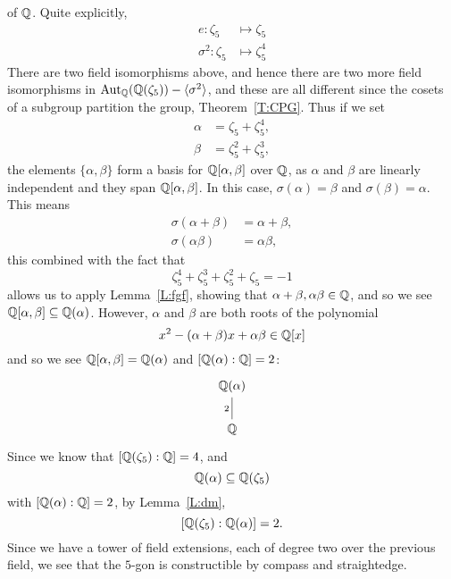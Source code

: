 \documentclass{ximera}
\begin{document}
\begin{example}
  of $\mathbb Q$. Quite explicitly,
  \begin{align*}
    e: \zeta_5 &\mapsto \zeta_5\\
    \sigma^2: \zeta_{5} &\mapsto \zeta_{5}^4
  \end{align*}
  There are two field isomorphisms above, and hence there are two more
  field isomorphisms in $\operatorname{Aut}_\mathbb Q(\mathbb Q(\zeta_{5})) - \langle \sigma^2\rangle$, and
  these are all different since the cosets of a subgroup partition the
  group, Theorem~\ref{T:CPG}. Thus if we set
  \begin{align*}
    \alpha &= \zeta_{5}   + \zeta_{5}^4,\\
    \beta &= \zeta_{5}^2 + \zeta_{5}^{3},
  \end{align*}
  the elements $\{\alpha,\beta\}$ form a basis for $\mathbb Q[\alpha,\beta]$
  over $\mathbb Q$, as $\alpha$ and $\beta$ are linearly independent and they
  span $\mathbb Q[\alpha,\beta]$. In this case, $\sigma(\alpha) = \beta$ and
  $\sigma(\beta) = \alpha$. This means
  \begin{align*}
    \sigma(\alpha+\beta) &= \alpha + \beta,\\
    \sigma(\alpha\beta) &= \alpha\beta,
  \end{align*}
  this combined with the fact that
  \[
  \zeta_5^4 + \zeta_5^3 + \zeta_5^2 + \zeta_5  = -1
  \]
  allows us to apply Lemma~\ref{L:fgf}, showing that
  $\alpha+\beta,\alpha\beta\in\mathbb Q$, and so we see $\mathbb Q[\alpha,\beta]
  \subseteq \mathbb Q(\alpha)$. However, $\alpha$ and $\beta$ are both roots of
  the polynomial
  \[
  x^2 - (\alpha +\beta) x + \alpha\beta\in\mathbb Q[x]
  \]
  and so we see $\mathbb Q[\alpha,\beta]= \mathbb Q(\alpha)$ and $[\mathbb Q(\alpha):\mathbb Q] =
  2$:
  \[
  \begin{tikzcd}
    \Q(\alpha) \\ \Q \ar[u,-,"2"]
  \end{tikzcd}
  \]
  Since we know that $[\mathbb Q(\zeta_{5}):\mathbb Q] = 4$, and
  \[
  \mathbb Q(\alpha)\subseteq \mathbb Q(\zeta_{5})
  \]
  with $[\mathbb Q(\alpha):\mathbb Q]=2$, by Lemma~\ref{L:dm},
  \[
    [\mathbb Q(\zeta_{5}):\mathbb Q(\alpha)]=2.
  \]
  Since we have a tower of field extensions, each of degree two over
  the previous field, we see that the $5$-gon is constructible by
  compass and straightedge.
\end{example}
\end{document}

